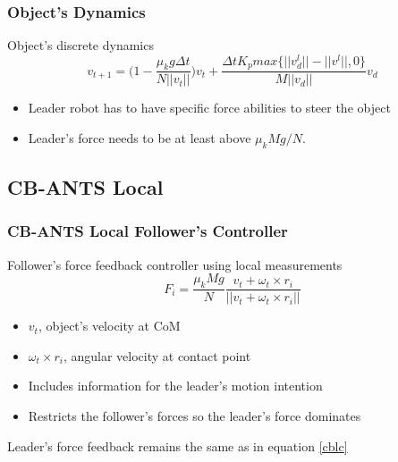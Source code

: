 \documentclass{beamer}
\begin{document}

\begin{frame}
\frametitle{Object's Dynamics}
Object's discrete dynamics
\begin{equation}
v_{t+1}= \Bigg(1-\frac{\mu_k g \Delta t}{N||v_t||}\Bigg)v_t+ \frac{\Delta t K_pmax\{ ||v_d^l||-||v^l||,0 \}}{M ||v_d||}v_d
\end{equation}
\begin{itemize}
\item Leader robot has to have specific force abilities to steer the object\vspace{.2cm}
\item Leader's force needs to be at least above $\mu_kMg/N$. 
\end{itemize}

\end{frame}

\subsection{CB-ANTS  Local}
\begin{frame}
\frametitle{CB-ANTS Local Follower's Controller}
Follower's force feedback controller using local measurements
\begin{equation}
F_i=\frac{\mu_kMg}{N}\frac{v_t+\omega_t\times r_i}{||v_t+\omega_t\times r_i||}
\end{equation}
\begin{itemize}
\item $v_t$, object's velocity at CoM 
\item $\omega_t \times r_i$, angular velocity at contact point
\item Includes information for the leader's motion intention 
\item Restricts the follower's forces so the leader's force dominates\vspace{.2cm}
\end{itemize}

Leader's force feedback remains the same as in equation \ref{cblc}
\end{frame}

\end{document}
